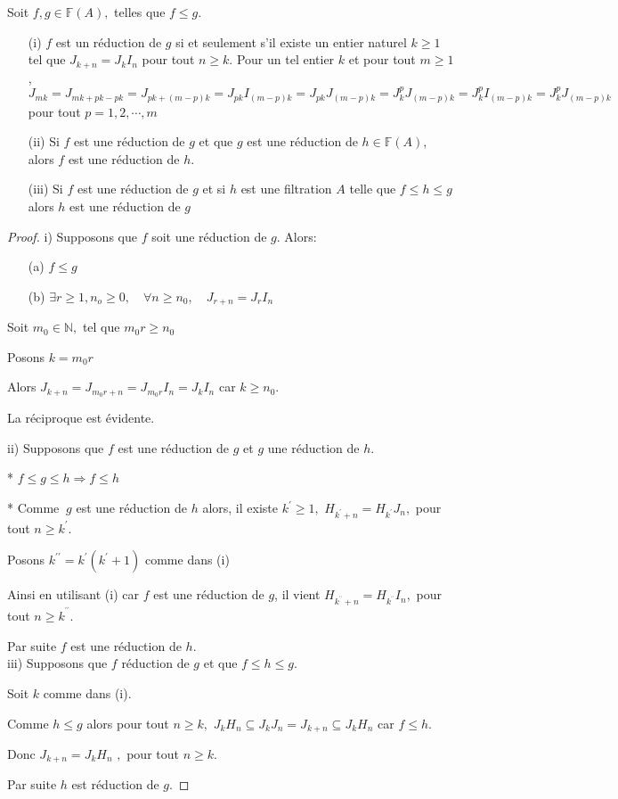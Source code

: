 \begin{maproposition}
	Soit $f,g \in \mathbb{F}(A),$ telles que $f \leqslant g$.
	\begin{enumerate}
		\label{maprop4}
		\item[(i)] $f$ est un réduction de $g$ si et seulement s'il existe un entier naturel $k \geqslant 1$ tel que $J_{k+n}  = J_{k}I_n$ pour tout $n \geqslant k$. Pour un tel entier $k$ et pour tout $m \geqslant 1$, $J_{mk}=J_{mk+pk-pk}=J_{pk+(m-p)k}=J_{pk}I_{(m-p)k}=J_{pk}J_{(m-p)k}=J_{k}^{p}J_{(m-p)k}=J_{k}^{p}I_{(m-p)k}=J_{k}^{p}J_{(m-p)k}
		$ pour tout $p=1,2,\cdots,m$
		\item[(ii)] Si $f$ est une réduction de $g$ et que $g$ est une réduction de $h \in \mathbb{F}(A)$, alors $f$ est une réduction de $h$. 
		\item[(iii)] Si $f$ est une réduction de $g$ et si $h$ est une filtration $A$ telle que $f \leqslant h \leqslant g$ alors $h$ est une réduction de $g$
	\end{enumerate}
\end{maproposition}
\begin{proof}
	i) Supposons que $f$ soit une réduction de $g$. Alors:
	\begin{enumerate}
		\item[(a)] $f \leqslant g$
		\item[(b)] $\exists r \geqslant 1,n_o \geqslant 0 ,\quad \forall n \geqslant n_0,\quad J_{r+n}= J_r I_n $
	\end{enumerate}
	Soit $m_{0}\in \mathbb{N},$ tel que $m_{0}r\geq n_{0}$
	
	Posons $k=m_{0}r$
	
	Alors $J_{k+n}=J_{m_{0}r+n}=J_{m_{0}r}I_{n}=J_{k}I_{n}$ car $k\geq n_{0}.$
	
	La réciproque est évidente.
	
	ii) Supposons que $f$ est une réduction de $g$ et $g$ une réduction
	de $h.$
	
	* $f\leq g\leq h\Rightarrow f\leq h$
	
	* Comme $\ g$ est une réduction de $h$ alors, il existe $k^{\prime }\geq
	1,$ $H_{k^{\prime }+n}=H_{k^{\prime }}J_{n},$ pour tout $n\geq k^{\prime }.$
	
	Posons $k^{\prime \prime }=k^{\prime }(k^{\prime }+1)$ comme dans (i)
	
	Ainsi en utilisant (i) car $f$ est une réduction de $g$, il vient  $H_{k^{^{\prime \prime }}+n}=H_{k^{^{\prime \prime }}}I_{n},$ pour tout $n\geq k^{^{\prime \prime }}.$
	
	Par suite $f$ est une réduction de $h$. \\
	
	iii) Supposons que $f$ réduction de $g$ et que $f\leq h\leq g.$
	
	Soit $k$ comme dans (i).
	
	Comme $h\leq g$ alors pour tout $n\geq k,$ $J_{k}H_{n}\subseteq
	J_{k}J_{n}=J_{k+n}\subseteq J_{k}H_{n}$ car $f\leq h.$
	
	Donc $J_{k+n}=J_{k}H_{n}$ $,$ pour tout $n\geq k.$
	
	Par suite $h$ est réduction de $g.$
\end{proof}


